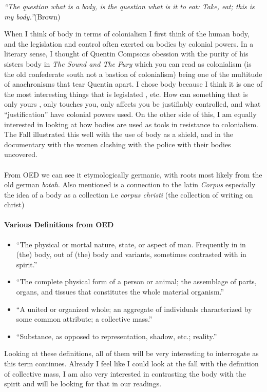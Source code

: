\textit{``The question what is a body, is the question what is it to eat: Take, eat; this is my body.''}(Brown) 


When I think of body in terms of colonialism I first think of the human body, and the legislation and control often exerted on bodies by colonial powers. In a literary sense, I thought of Quentin Compsons obession with the purity of his sisters body in \textit{The Sound and The Fury} which you can read as colonialism (is the old confederate south not a bastion of colonialism) being one of the multitude of anachronisms that tear Quentin apart. I chose body because I think it is one of the most interesting things that is legislated , etc. How can something that is only yours , only touches you, only affects you be justifiably controlled, and what ``justification'' have colonial powers used. 
On the other side of this, I am equally interested in looking at how bodies are used as tools in resistance to colonialism. The Fall illustrated this well with the use of body as a shield, and in the documentary with the women clashing with the police with their bodies uncovered.

\paragraph{}
From OED we can see it etymologically germanic, with roots most likely from the old german \textit{botah}. Also mentioned is a connection to the latin \textit{Corpus} especially the idea of a body as a collection i.e \textit{corpus christi} (the collection of writing on christ)
\paragraph{Various Definitions from OED}
\begin{itemize}
\item ``The physical or mortal nature, state, or aspect of man. Frequently in in (the) body, out of (the) body and variants, sometimes contrasted with in spirit.''

\item``The complete physical form of a person or animal; the assemblage of parts, organs, and tissues that constitutes the whole material organism.''

\item``A united or organized whole; an aggregate of individuals characterized by some common attribute; a collective mass.''

\item``Substance, as opposed to representation, shadow, etc.; reality.''

\end{itemize}
Looking at these definitions, all of them will be very interesting to interrogate as this term continues. Already I feel like I could look at the fall with the definition of collective mass, I am also very interested in contrasting the body with the spirit and will be looking for that in our readings.
